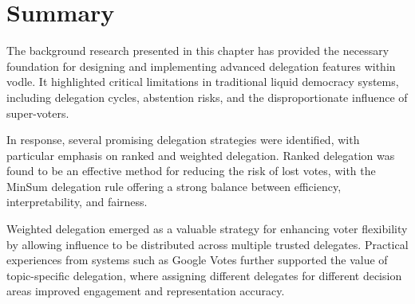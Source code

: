 



\section{Summary}
The background research presented in this chapter has provided the necessary foundation for designing and implementing advanced delegation features within vodle.  
It highlighted critical limitations in traditional liquid democracy systems, including delegation cycles, abstention risks, and the disproportionate influence of super-voters.

In response, several promising delegation strategies were identified, with particular emphasis on ranked and weighted delegation.  
Ranked delegation was found to be an effective method for reducing the risk of lost votes, with the MinSum delegation rule offering a strong balance between efficiency, interpretability, and fairness.

Weighted delegation emerged as a valuable strategy for enhancing voter flexibility by allowing influence to be distributed across multiple trusted delegates.  
Practical experiences from systems such as Google Votes further supported the value of topic-specific delegation, where assigning different delegates for different decision areas improved engagement and representation accuracy.

